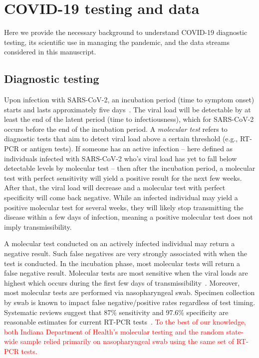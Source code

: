 \documentclass[11pt]{amsart}
\numberwithin{equation}{section}
\theoremstyle{plain}
\begin{document}

 \section{COVID-19 testing and data}
 \label{section:data}

Here we provide the necessary background to understand COVID-19 diagnostic testing, its scientific use in managing the pandemic, and the data streams considered in this manuscript.

\subsection{Diagnostic testing}
\label{section:testinginfo}

 Upon infection with SARS-CoV-2, an incubation period (time to symptom onset) starts and lasts approximately five days~\citep{Lauer2020}.  The viral load will be detectable by at least the end of the latent period (time to infectiousness), which for SARS-CoV-2 occurs before the end of the incubation period.  A \emph{molecular test} refers to diagnostic tests that aim to detect viral load above a certain threshold (e.g., RT-PCR or antigen tests).  If someone has an active infection -- here defined as individuals infected with SARS-CoV-2 who's viral load has yet to fall below detectable levels by molecular test -- then after the incubation period, a molecular test with perfect sensitivity will yield a positive result for the next few weeks.  After that, the viral load will decrease and a molecular test with perfect specificity will come back negative. While an infected individual may yield a positive molecular test for several weeks, they will likely stop transmitting the disease within a few days of infection, meaning a positive molecular test does not imply transmissibility.

 A molecular test conducted on an actively infected individual may return a negative result.  Such false negatives are very strongly associated with when the test is conducted.  In the incubation phase, most molecular tests will return a false negative result.  Molecular tests are most sensitive when the viral loads are highest which occurs during the first few days of transmissibility~\citep{Mina2020}.   Moreover, most molecular tests are performed via nasopharyngeal swab.  Specimen collection by swab is known to impact false negative/positive rates regardless of test timing.   Systematic reviews suggest that 87\% sensitivity and 97.6\% specificity are reasonable estimates for current RT-PCR tests~\citep{Arevalo2020, Woloshin2020,Cohen2020}.  \textcolor{red}{To the best of our knowledge, both Indiana Department of Health's molecular testing and the random state-wide sample relied primarily on nasopharyngeal swab using the same set of RT-PCR tests.}
\end{document}
